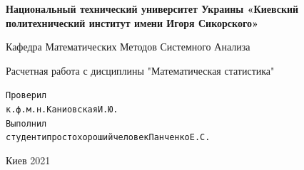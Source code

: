 \documentclass[14pt,a4paper]{scrartcl}
\theoremstyle{definition}
\theoremstyle{remark}
\theoremstyle{definition}
\theoremstyle{definition}
\begin{document}
\begin{titlepage}
    \newpage
    \begin{center}
    {\bfseries Национальный технический университет Украины «Киевский политехнический институт имени Игоря Сикорского»}
    \vspace{1cm}

    Кафедра Математических Методов Системного Анализа
    \vspace{6em}




    \end{center}

    \vspace{1.2em}

    \begin{center}
    \Large Расчетная работа с дисциплины "Математическая статистика"
    \end{center}

    \vspace{5em}

    \begin{center}
     \end{center}
    \vspace{6em}


    \begin{alltt}
                       Проверил
                       к.ф.м.н. Каниовская И. Ю.
                       Выполнил
                       студент и просто хороший человек Панченко Е. С.
    \end{alltt}


    \vspace{\fill}

    \begin{center}
    Киев 2021
    \end{center}

    \end{titlepage}
\end{document}
